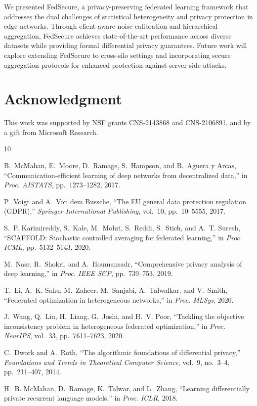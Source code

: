 \documentclass[conference]{IEEEtran}
\begin{document}
We presented FedSecure, a privacy-preserving federated learning framework that addresses the dual challenges of statistical heterogeneity and privacy protection in edge networks. Through client-aware noise calibration and hierarchical aggregation, FedSecure achieves state-of-the-art performance across diverse datasets while providing formal differential privacy guarantees. Future work will explore extending FedSecure to cross-silo settings and incorporating secure aggregation protocols for enhanced protection against server-side attacks.

\section*{Acknowledgment}

This work was supported by NSF grants CNS-2143868 and CNS-2106891, and by a gift from Microsoft Research.

\begin{thebibliography}{10}

B.~McMahan, E.~Moore, D.~Ramage, S.~Hampson, and B.~Aguera y Arcas, ``Communication-efficient learning of deep networks from decentralized data,'' in \textit{Proc. AISTATS}, pp.~1273--1282, 2017.

P.~Voigt and A.~Von dem Bussche, ``The {EU} general data protection regulation ({GDPR}),'' \textit{Springer International Publishing}, vol.~10, pp.~10--5555, 2017.

S.~P. Karimireddy, S.~Kale, M.~Mohri, S.~Reddi, S.~Stich, and A.~T. Suresh, ``{SCAFFOLD}: Stochastic controlled averaging for federated learning,'' in \textit{Proc. ICML}, pp.~5132--5143, 2020.

M.~Nasr, R.~Shokri, and A.~Houmansadr, ``Comprehensive privacy analysis of deep learning,'' in \textit{Proc. IEEE S\&P}, pp.~739--753, 2019.

T.~Li, A.~K. Sahu, M.~Zaheer, M.~Sanjabi, A.~Talwalkar, and V.~Smith, ``Federated optimization in heterogeneous networks,'' in \textit{Proc. MLSys}, 2020.

J.~Wang, Q.~Liu, H.~Liang, G.~Joshi, and H.~V. Poor, ``Tackling the objective inconsistency problem in heterogeneous federated optimization,'' in \textit{Proc. NeurIPS}, vol.~33, pp.~7611--7623, 2020.

C.~Dwork and A.~Roth, ``The algorithmic foundations of differential privacy,'' \textit{Foundations and Trends in Theoretical Computer Science}, vol.~9, no.~3--4, pp.~211--407, 2014.

H.~B. McMahan, D.~Ramage, K.~Talwar, and L.~Zhang, ``Learning differentially private recurrent language models,'' in \textit{Proc. ICLR}, 2018.

\end{thebibliography}
\end{document}
